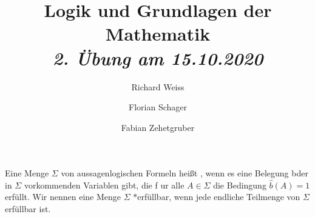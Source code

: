 \documentclass{article}
\title
{
  Logik und Grundlagen der Mathematik \\
  \vspace{4pt}
  \normalsize
  \textit{2. Übung am 15.10.2020}
}
\author
{
  Richard Weiss
  \and
  Florian Schager
  \and
  Fabian Zehetgruber
}
\date{}
\begin{document}
\maketitle

Eine Menge $\Sigma$ von aussagenlogischen Formeln heißt , wenn es eine Belegung bder in $\Sigma$ vorkommenden Variablen gibt, die f ur alle $A \in \Sigma$ die Bedingung $\hat{b}(A) = 1$ erfüllt.
Wir nennen eine Menge $\Sigma$ $\ast$erfüllbar, wenn jede endliche Teilmenge von $\Sigma$ erfüllbar ist.














\end{document}
